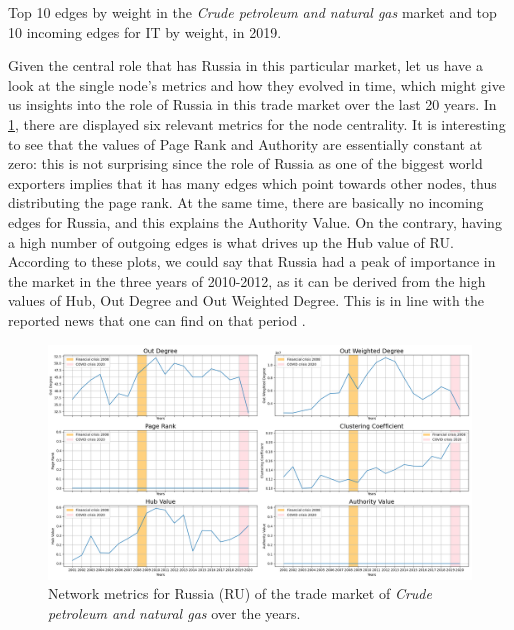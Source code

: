 \begin{table}
    \centering
    
    \caption{Top 10 edges by weight in the \textit{Crude petroleum and natural gas} market and top 10 incoming edges for IT by weight, in 2019.}
    \label{tab:top10gasimp}
\end{table}

Given the central role that has Russia in this particular market, let us have a look at the single node's metrics and how they evolved in time, which might give us insights into the role of Russia in this trade market over the last 20 years. In \cref{fig:rusmetrics}, there are displayed six relevant metrics for the node centrality. It is interesting to see that the values of Page Rank and Authority are essentially constant at zero: this is not surprising since the role of Russia as one of the biggest world exporters implies that it has many edges which point towards other nodes, thus distributing the page rank. At the same time, there are basically no incoming edges for Russia, and this explains the Authority Value. On the contrary, having a high number of outgoing edges is what drives up the Hub value of RU. According to these plots, we could say that Russia had a peak of importance in the market in the three years of 2010-2012, as it can be derived from the high values of Hub, Out Degree and Out Weighted Degree. This is in line with the reported news that one can find on that period \cite{reutersru1,reutersru2}.

\begin{figure}
    \centering
    \includegraphics[width=\textwidth]{pics/RU_p06_metric_ts.png}
    \caption{Network metrics for Russia (RU) of the trade market of \textit{Crude petroleum and natural gas} over the years.}
    \label{fig:rusmetrics}
\end{figure}


